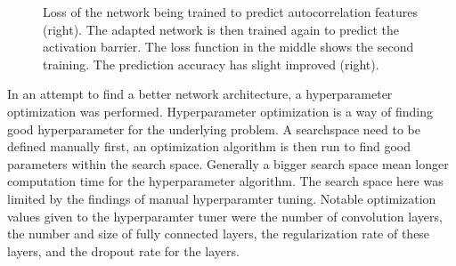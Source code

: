 \begin{figure}[!htb]
    \endminipage
    \caption{
    Loss of the network being trained to predict autocorrelation features (right).
    The adapted network is then trained again to predict the activation barrier. The loss function in the middle shows the second training.
    The prediction accuracy has slight improved (right).  
    }
    \label{fig:transfer_final}
\end{figure}

In an attempt to find a better network architecture, a hyperparameter optimization was performed.
Hyperparameter optimization is a way of finding good hyperparameter for the underlying problem.
A searchspace need to be defined manually first, an optimization algorithm is then run to find good parameters within the search space.
Generally a bigger search space mean longer computation time for the hyperparameter algorithm.
The search space here was limited by the findings of manual hyperparamter tuning.
Notable optimization values given to the hyperparamter tuner were the number of convolution layers, 
the number and size of fully connected layers, the regularization rate of these layers, and the dropout rate for the layers.


